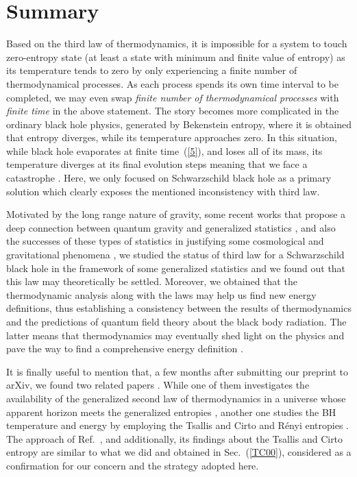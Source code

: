 \documentclass[twocolumn,preprintnumbers,amsmath,nofootinbib,amssymb]{revtex4}
\begin{document}
\section{Summary}

Based on the third law of thermodynamics, it is impossible for a
system to touch zero-entropy state (at least a state with minimum
and finite value of entropy) as its temperature tends to zero by
only experiencing a finite number of thermodynamical processes. As
each process spends its own time interval to be completed, we may
even swap \textit{finite number of thermodynamical processes} with
\textit{finite time} in the above statement. The story becomes
more complicated in the ordinary black hole physics, generated by
Bekenstein entropy, where it is obtained that entropy diverges,
while its temperature approaches zero. In this situation, while
black hole evaporates at finite time~(\ref{5}), and loses all of
its mass, its temperature diverges at its final evolution steps
meaning that we face a catastrophe \cite{ali}. Here, we only
focused on Schwarzschild black hole as a primary solution which
clearly exposes the mentioned inconsistency with third law.

Motivated by the long range nature of gravity, some recent works
that propose a deep connection between quantum gravity and
generalized statistics \cite{epl,homa,mesri,barrow,mesri2}, and
also the successes of these types of statistics in justifying some
cosmological and gravitational phenomena
\cite{tsallis,refgerg,gerg,non13,nonK,EPJC,KHDE,sadeghi,mesri2},
we studied the status of third law for a Schwarzschild black hole
in the framework of some generalized statistics and we found out
that this law may theoretically be settled. Moreover, we obtained
that the thermodynamic analysis along with the laws may help us find new
energy definitions, thus establishing a consistency between the results
of thermodynamics and the predictions of quantum field theory
about the black body radiation. The latter means that
thermodynamics may eventually shed light on the physics and pave the way to find a
comprehensive energy definition \cite{energy,energy1}.

It is finally useful to mention that, a few months after
submitting our preprint to arXiv, we found two related papers
\cite{plb,gen1}. While one of them investigates the availability
of the generalized second law of thermodynamics in a universe
whose apparent horizon meets the generalized entropies \cite{plb},
another one studies the BH temperature and energy by employing the
Tsallis and Cirto and R\'{e}nyi entropies \cite{gen1}. The
approach of Ref.~\cite{gen1}, and additionally, its findings about
the Tsallis and Cirto entropy are similar to what we did and
obtained in Sec.~(\ref{TC00}), considered as a confirmation for
our concern and the strategy adopted here.
\end{document}
